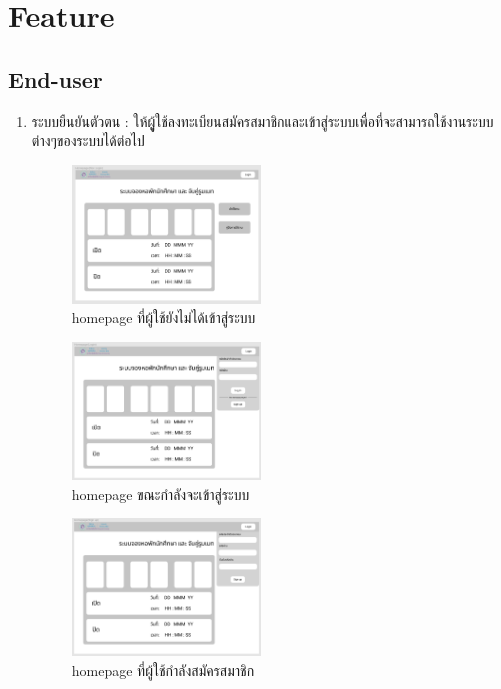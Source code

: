 \section{Feature}
\subsection{End-user}
\begin{enumerate}
  \item ระบบยืนยันตัวตน : ให้ผูู้ใช้ลงทะเบียนสมัครสมาชิกและเข้าสู่ระบบเพื่อที่จะสามารถใช้งานระบบต่างๆของระบบได้ต่อไป
  \begin{figure}[h]
  \begin{center}
  \includegraphics[width=50mm,scale=0.5]{photo/homepageNoAuth.png}
  \end{center}
  \caption{homepage ที่ผู้ใช้ยังไม่ได้เข้าสู่ระบบ}
  \label{fig:hp-no-auth}
  \end{figure}

  \begin{figure}[h]
  \begin{center}
  \includegraphics[width=50mm,scale=0.5]{photo/homepageLogin.png}
  \end{center}
  \caption{homepage ขณะกำลังจะเข้าสู่ระบบ}
  \label{fig:hp-login}
  \end{figure}

  \begin{figure}[h]
  \begin{center}
  \includegraphics[width=50mm,scale=0.5]{photo/homepageReg.png}
  \end{center}
  \caption{homepage ที่ผู้ใช้กำลังสมัครสมาชิก}
  \label{fig:hp-reg}
  \end{figure}


\end{enumerate}
